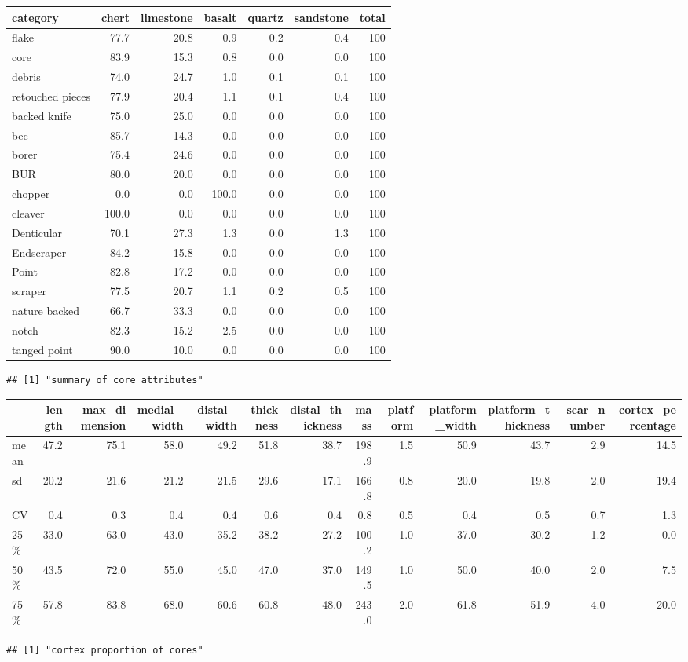 \documentclass[]{article}
\begin{document}
\begin{longtable}[]{@{}lrrrrrr@{}}
\toprule
category & chert & limestone & basalt & quartz & sandstone &
total\tabularnewline
\midrule
\endhead
flake & 77.7 & 20.8 & 0.9 & 0.2 & 0.4 & 100\tabularnewline
core & 83.9 & 15.3 & 0.8 & 0.0 & 0.0 & 100\tabularnewline
debris & 74.0 & 24.7 & 1.0 & 0.1 & 0.1 & 100\tabularnewline
retouched pieces & 77.9 & 20.4 & 1.1 & 0.1 & 0.4 & 100\tabularnewline
backed knife & 75.0 & 25.0 & 0.0 & 0.0 & 0.0 & 100\tabularnewline
bec & 85.7 & 14.3 & 0.0 & 0.0 & 0.0 & 100\tabularnewline
borer & 75.4 & 24.6 & 0.0 & 0.0 & 0.0 & 100\tabularnewline
BUR & 80.0 & 20.0 & 0.0 & 0.0 & 0.0 & 100\tabularnewline
chopper & 0.0 & 0.0 & 100.0 & 0.0 & 0.0 & 100\tabularnewline
cleaver & 100.0 & 0.0 & 0.0 & 0.0 & 0.0 & 100\tabularnewline
Denticular & 70.1 & 27.3 & 1.3 & 0.0 & 1.3 & 100\tabularnewline
Endscraper & 84.2 & 15.8 & 0.0 & 0.0 & 0.0 & 100\tabularnewline
Point & 82.8 & 17.2 & 0.0 & 0.0 & 0.0 & 100\tabularnewline
scraper & 77.5 & 20.7 & 1.1 & 0.2 & 0.5 & 100\tabularnewline
nature backed & 66.7 & 33.3 & 0.0 & 0.0 & 0.0 & 100\tabularnewline
notch & 82.3 & 15.2 & 2.5 & 0.0 & 0.0 & 100\tabularnewline
tanged point & 90.0 & 10.0 & 0.0 & 0.0 & 0.0 & 100\tabularnewline
\bottomrule
\end{longtable}

\begin{verbatim}
## [1] "summary of core attributes"
\end{verbatim}

\begin{longtable}[]{@{}lrrrrrrrrrrrr@{}}
\toprule
& length & max\_dimension & medial\_width & distal\_width & thickness &
distal\_thickness & mass & platform & platform\_width &
platform\_thickness & scar\_number & cortex\_percentage\tabularnewline
\midrule
\endhead
mean & 47.2 & 75.1 & 58.0 & 49.2 & 51.8 & 38.7 & 198.9 & 1.5 & 50.9 &
43.7 & 2.9 & 14.5\tabularnewline
sd & 20.2 & 21.6 & 21.2 & 21.5 & 29.6 & 17.1 & 166.8 & 0.8 & 20.0 & 19.8
& 2.0 & 19.4\tabularnewline
CV & 0.4 & 0.3 & 0.4 & 0.4 & 0.6 & 0.4 & 0.8 & 0.5 & 0.4 & 0.5 & 0.7 &
1.3\tabularnewline
25\% & 33.0 & 63.0 & 43.0 & 35.2 & 38.2 & 27.2 & 100.2 & 1.0 & 37.0 &
30.2 & 1.2 & 0.0\tabularnewline
50\% & 43.5 & 72.0 & 55.0 & 45.0 & 47.0 & 37.0 & 149.5 & 1.0 & 50.0 &
40.0 & 2.0 & 7.5\tabularnewline
75\% & 57.8 & 83.8 & 68.0 & 60.6 & 60.8 & 48.0 & 243.0 & 2.0 & 61.8 &
51.9 & 4.0 & 20.0\tabularnewline
\bottomrule
\end{longtable}

\begin{verbatim}
## [1] "cortex proportion of cores"
\end{verbatim}
\end{document}
